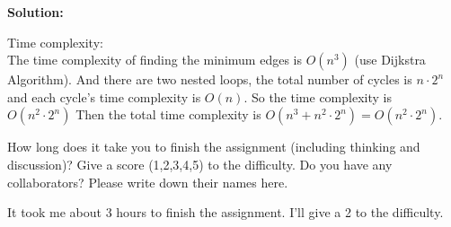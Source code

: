 \documentclass{oxmathproblems}
\begin{document}
\begin{questions}

\textbf{Solution:}


Time complexity:\\
The time complexity of finding the minimum edges is $O(n^3)$ (use Dijkstra Algorithm).
And there are two nested loops, the total number of cycles is $n\cdot 2^n$ and each cycle's time complexity is $O(n)$. So the time complexity is $O(n^2\cdot 2^n)$
Then the total time complexity is $O(n^3 + n^2\cdot 2^n) = O(n^2\cdot 2^n)$.

\miquestion
How long does it take you to finish the assignment (including thinking and discussion)?
Give a score (1,2,3,4,5) to the difficulty.
Do you have any collaborators?
Please write down their names here.

It took me about 3 hours to finish the assignment. I'll give a 2 to the difficulty.

\end{questions}
\end{document}
